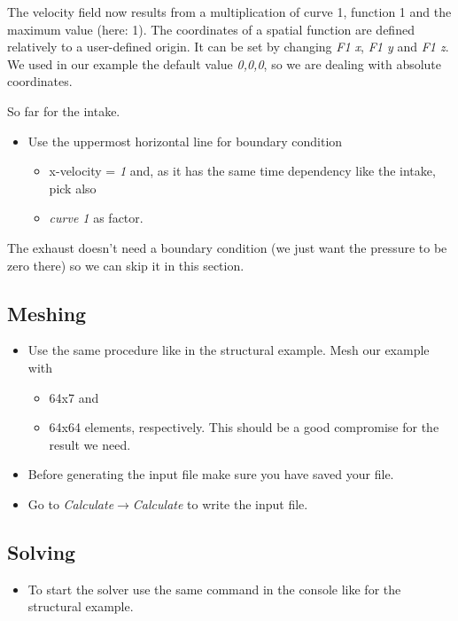 The velocity field now results from a multiplication of curve 1, function
1 and the maximum value (here: 1). The coordinates of a spatial function are defined relatively to a user-defined origin. It can be set by changing \emph{F1 x}, \emph{F1 y} and  \emph{F1 z}. We used in our example the default value \emph{0,0,0}, so we are dealing with absolute coordinates.

So far for the intake.

\begin{itemize}
\item Use the uppermost horizontal line for boundary condition 

\begin{itemize}
\item x-velocity = \emph{1} and, as it has the same time dependency like
the intake, pick also 
\item \emph{curve 1} as factor.
\end{itemize}
\end{itemize}
The exhaust doesn't need a boundary condition (we just want the pressure
to be zero there) so we can skip it in this section. 


\subsection{Meshing}

\begin{itemize}
\item Use the same procedure like in the structural example. Mesh our example
with 

\begin{itemize}
\item 64x7 and 
\item 64x64 elements, respectively. This should be a good compromise for
the result we need.
\end{itemize}
\item Before generating the input file make sure you have saved your file.
\item Go to \emph{Calculate$\to$Calculate} to write the input file.
\end{itemize}

\subsection{Solving}

\begin{itemize}
\item To start the solver use the same command in the console like for the
structural example.
\end{itemize}


